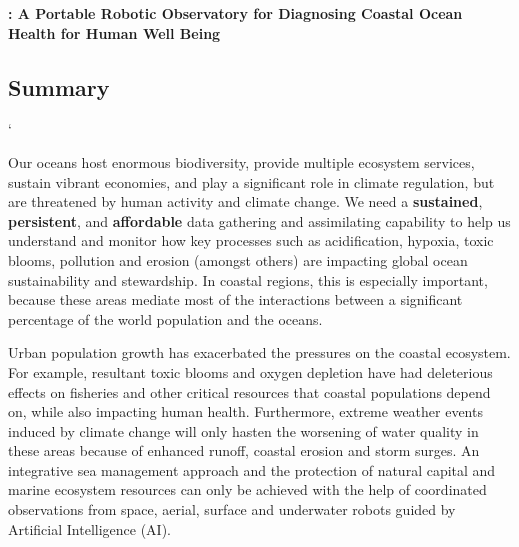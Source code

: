\documentclass[12pt]{article}
\begin{document}
\vspace*{1cm}
\begin{center}
  {\large \bf{\proe}: A Portable Robotic Observatory for Diagnosing
    Coastal Ocean Health for Human Well
    Being}\footnotemark{}\\
\end{center}




\vspace*{-0.2cm}
\subsection{Summary}
`

Our oceans host enormous biodiversity, provide multiple ecosystem
services, sustain vibrant economies, and play a significant role in
climate regulation, but are threatened by human activity and climate
change.  We need a \textbf{sustained}, \textbf{persistent}, and
\textbf{affordable} data gathering and assimilating capability to help
us understand and monitor how key processes such as acidification,
hypoxia, toxic blooms, pollution and erosion (amongst others) are
impacting global ocean sustainability and stewardship.  In coastal
regions, this is especially important, because these areas mediate
most of the interactions between a significant percentage of the world
population and the oceans.

Urban population growth has exacerbated the pressures on the coastal
ecosystem.  For example, resultant toxic blooms and oxygen depletion
have had deleterious effects on fisheries and other critical resources
that coastal populations depend on, while also impacting human
health. Furthermore, extreme weather events induced by climate change
will only hasten the worsening of water quality in these areas because
of enhanced runoff, coastal erosion and storm surges. An integrative
sea management approach and the protection of natural capital and
marine ecosystem resources can only be achieved with the help of
coordinated observations from space, aerial, surface and underwater
robots guided by Artificial Intelligence (AI).
\end{document}

